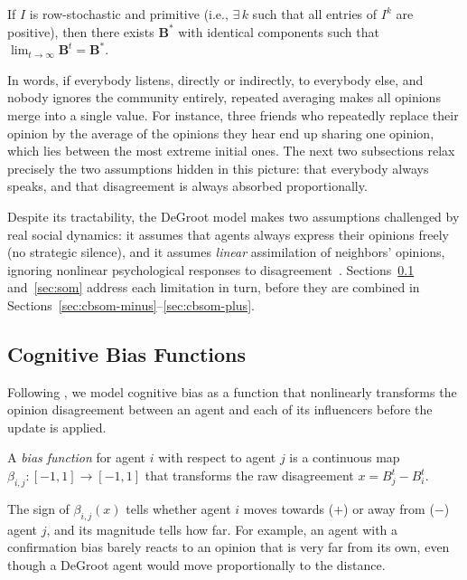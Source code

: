 \begin{theorem}\label{thm:degroot}
  If $I$ is row-stochastic and primitive (i.e., $\exists\,k$ such
  that all entries of $I^k$ are positive), then there exists
  $\mathbf{B}^*$ with identical components such that
  $\lim_{t\to\infty}\mathbf{B}^t=\mathbf{B}^*$.
\end{theorem}

In words, if everybody listens, directly or indirectly, to everybody
else, and nobody ignores the community entirely, repeated averaging
makes all opinions merge into a single value. For instance, three friends
who repeatedly replace their opinion by the average of the opinions they
hear end up sharing one opinion, which lies between the most extreme
initial ones. The next two subsections relax precisely the two
assumptions hidden in this picture: that everybody always speaks, and
that disagreement is always absorbed proportionally.

Despite its tractability, the DeGroot model makes two assumptions
challenged by real social dynamics: it assumes that agents always
express their opinions freely (no strategic silence), and it assumes
\emph{linear} assimilation of neighbors' opinions, ignoring nonlinear
psychological responses to disagreement~\cite{Alvim2024,NoelleNeumann1984}.
Sections~\ref{sec:biases} and~\ref{sec:som} address each limitation
in turn, before they are combined in
Sections~\ref{sec:cbsom-minus}--\ref{sec:cbsom-plus}.

\subsection{Cognitive Bias Functions}
\label{sec:biases}

Following \cite{Alvim2024}, we model cognitive bias as a function that
nonlinearly transforms the opinion disagreement between an agent and
each of its influencers before the update is applied.

\begin{definition}\label{def:bias-fn}
  A \emph{bias function} for agent $i$ with respect to agent $j$ is
  a continuous map $\beta_{i,j}:[-1,1]\to[-1,1]$
  that transforms the raw disagreement $x=B_j^t-B_i^t$.
\end{definition}

The sign of $\beta_{i,j}(x)$ tells whether agent $i$ moves towards
($+$) or away from ($-$) agent $j$, and its magnitude tells how far.
For example, an agent with a confirmation bias barely reacts to an
opinion that is very far from its own, even though a DeGroot agent would
move proportionally to the distance.

